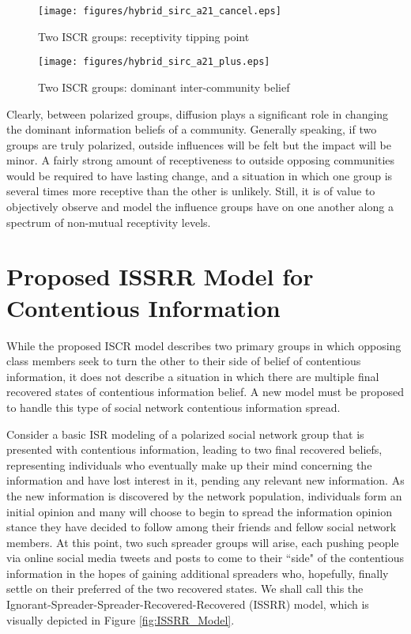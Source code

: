 \begin{figure}[!htbp] \centering
  \texttt{[image: figures/hybrid\_sirc\_a21\_cancel.eps]}
  \caption{Two ISCR groups: receptivity tipping point}
  \label{fig:hybrid_sirc_a21_cancel}
\end{figure}

\begin{figure}[!htbp] \centering
  \texttt{[image: figures/hybrid\_sirc\_a21\_plus.eps]}
  \caption{Two ISCR groups: dominant inter-community belief}
  \label{fig:hybrid_sirc_a21_plus}
\end{figure}

Clearly, between polarized groups, diffusion plays a significant role in changing the dominant information beliefs of a community. Generally speaking, if two groups are truly polarized, outside influences will be felt but the impact will be minor. A fairly strong amount of receptiveness to outside opposing communities would be required to have lasting change, and a situation in which one group is several times more receptive than the other is unlikely. Still, it is of value to objectively observe and model the influence groups have on one another along a spectrum of non-mutual receptivity levels.

\section{Proposed ISSRR Model for Contentious Information}
While the proposed ISCR model describes two primary groups in which opposing class members seek to turn the other to their side of belief of contentious information, it does not describe a situation in which there are multiple final recovered states of contentious information belief. A new model must be proposed to handle this type of social network contentious information spread.

Consider a basic ISR modeling of a polarized social network group that is presented with contentious information, leading to two final recovered beliefs, representing individuals who eventually make up their mind concerning the information and have lost interest in it, pending any relevant new information. As the new information is discovered by the network population, individuals form an initial opinion and many will choose to begin to spread the information opinion stance they have decided to follow among their friends and fellow social network members. At this point, two such spreader groups will arise, each pushing people via online social media tweets and posts to come to their ``side" of the contentious information in the hopes of gaining additional spreaders who, hopefully, finally settle on their preferred of the two recovered states. We shall call this the Ignorant-Spreader-Spreader-Recovered-Recovered (ISSRR) model, which is visually depicted in Figure \ref{fig:ISSRR_Model}.

